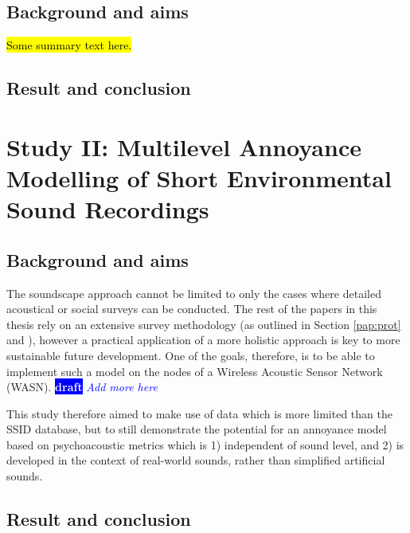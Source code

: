 \documentclass[twoside,fontsize=12pt,titlepage]{scrbook}
\newcommand{\remark}[3]{%
    {\colorbox{#2}{\sffamily\scriptsize\bfseries\textcolor{white}{#1}}}
    {\sffamily\small\itshape\textcolor{#2}{#3}}
}
\newcommand{\draft}[1]{\remark{draft}{blue}{#1}}
\begin{document}
 \subsection*{Background and aims}

       \hl{Some summary text here.}

 \subsection*{Result and conclusion}

       


\section{Study II: Multilevel Annoyance Modelling of Short Environmental Sound Recordings}

 \subsection*{Background and aims}
       The soundscape approach cannot be limited to only the cases where detailed acoustical or social surveys can be conducted. The rest of the papers in this thesis rely on an extensive survey methodology (as outlined in Section \ref{pap:prot} and \citep{Mitchell2020Soundscape}), however a practical application of a more holistic approach is key to more sustainable future development. One of the goals, therefore, is to be able to implement such a model on the nodes of a Wireless Acoustic Sensor Network (WASN). \draft{Add more here}

       This study therefore aimed to make use of data which is more limited than the SSID database, but to still demonstrate the potential for an annoyance model based on psychoacoustic metrics which is 1) independent of sound level, and 2) is developed in the context of real-world sounds, rather than simplified artificial sounds.

 \subsection*{Result and conclusion}

       

\end{document}
